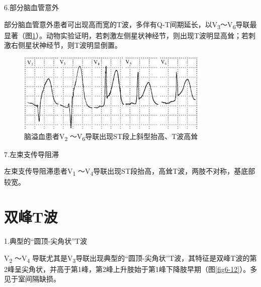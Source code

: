 6.部分脑血管意外

部分脑血管意外患者可出现高而宽的T波，多伴有Q-T间期延长，以V\textsubscript{3}～V\textsubscript{6}导联最显著（图\ref{fig6-11}）。动物实验证明，若刺激左侧星状神经节，则出现T波明显高耸；若刺激右侧星状神经节，则T波明显倒置。

\begin{figure}[!htbp]
 \centering
 \includegraphics[width=3.60417in,height=1.47917in]{./images/Image00103.jpg}
 \captionsetup{justification=centering}
 \caption{脑溢血患者V\textsubscript{2} ～V\textsubscript{6}导联出现ST段上斜型抬高、T波高耸}
 \label{fig6-11}
  \end{figure} 


7.左束支传导阻滞

左束支传导阻滞患者V\textsubscript{1} ～V\textsubscript{4}导联出现ST段抬高，高耸T波，两肢不对称，基底部较宽。

\protect\hypertarget{text00012.htmlux5cux23subid94}{}{}

\section{双峰T波}

1.典型的“圆顶-尖角状”T波

V\textsubscript{2} ～V\textsubscript{4} 导联尤其是V\textsubscript{3}导联出现典型的“圆顶-尖角状”T波，其特征是双峰T波的第2峰呈尖角状，并高于第1峰，第2峰上升肢始于第1峰下降肢早期（图\ref{fig6-12}）。多见于室间隔缺损。

